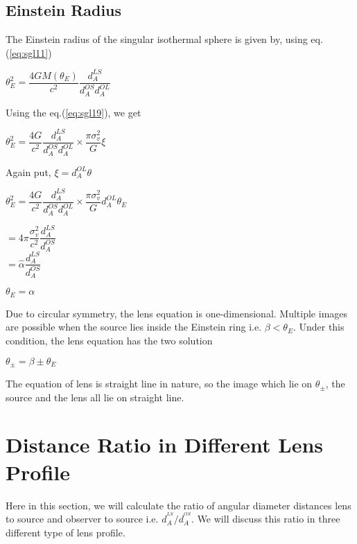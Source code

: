 \documentclass[12pt]{report}
\begin{document}
\subsection{Einstein Radius}
The Einstein radius of the singular isothermal sphere is given by, using eq.(\ref{eq:sgl11})
\begin{center}
	$\theta_E^2=\dfrac{4GM(\theta_E)}{c^2}\dfrac{d_A^{{LS}}}{d_A^{{OS}}d_A^{{OL}}}$
\end{center}
Using the eq.(\ref{eq:sgl19}), we get
\begin{center}
	$\theta_E^2=\dfrac{4G}{c^2}\dfrac{d_A^{{LS}}}{d_A^{{OS}}d_A^{{OL}}}\times \dfrac{\pi\sigma_v^2}{G}\xi$
\end{center}
Again put, $\xi=d_A^{{OL}}\theta$
\begin{center}
	$\theta_E^2=\dfrac{4G}{c^2}\dfrac{d_A^{{LS}}}{d_A^{{OS}}d_A^{{OL}}}\times \dfrac{\pi\sigma_v^2}{G}d_A^{{OL}}\theta_E$
\end{center}
\hspace{47mm} $={4\pi\dfrac{\sigma_v^2}{c^2}}\dfrac{d_A^{{LS}}}{d_A^{{OS}}}$ \\
\vspace{3mm}
\hspace{45mm} $=\hat\alpha\dfrac{d_A^{{LS}}}{d_A^{{OS}}}$
\begin{center}
$\boxed{\theta_E=\alpha}$
\end{center}
Due to circular symmetry, the lens equation is  one-dimensional.
Multiple images are possible when the source lies  inside the  Einstein ring i.e. $\beta<\theta_E$. Under this condition, the lens equation has the two solution
\begin{center}
	$\theta_\pm=\beta\pm\theta_E$
\end{center}
The equation of lens is straight line in nature, so the image which lie on $\theta_\pm$, the source and the lens all lie on straight line.

\section{Distance Ratio in Different Lens Profile}
Here in this section, we will calculate the ratio of angular diameter distances lens to source and observer to source i.e. ${d_A^{^{LS}}}/{d_A^{^{OS}}}$.  We will discuss this ratio in three different type of lens profile.
\end{document}
